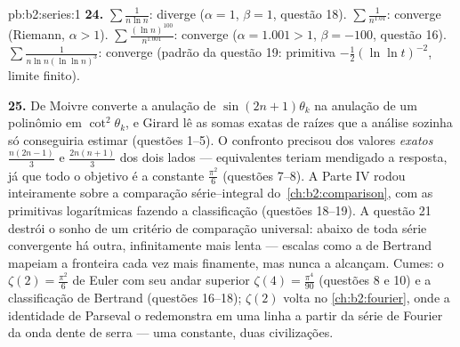 \begin{solution}{pb:b2:series:1}
\textbf{24.} $\sum\frac1{n\ln n}$: diverge ($\alpha = 1$,
$\beta = 1$, questão 18). $\sum\frac1{n^{1.01}}$: converge
(Riemann, $\alpha > 1$). $\sum\frac{(\ln n)^{100}}{n^{1.001}}$:
converge ($\alpha = 1.001 > 1$, $\beta = -100$, questão 16).
$\sum\frac1{n\ln n(\ln\ln n)^3}$: converge (padrão da questão 19:
primitiva $-\frac12(\ln\ln t)^{-2}$, limite finito).

\textbf{25.} De Moivre converte a anulação de $\sin(2n{+}1)
\theta_k$ na anulação de um polinômio em
$\cot^2\theta_k$, e Girard lê as somas exatas de raízes que
a análise sozinha só conseguiria estimar (questões 1--5). O
confronto precisou dos valores \emph{exatos} $\frac{n(2n-1)}3$ e
$\frac{2n(n+1)}3$ dos dois lados --- equivalentes teriam
mendigado a resposta, já que todo o objetivo é a constante
$\frac{\pi^2}6$ (questões 7--8). A Parte IV rodou inteiramente sobre
a comparação série--integral do~\cref{ch:b2:comparison}, com as
primitivas logarítmicas fazendo a classificação (questões
18--19). A questão 21 destrói o sonho de um critério de
comparação universal: abaixo de toda série convergente há outra,
infinitamente mais lenta --- escalas como a de Bertrand mapeiam a fronteira
cada vez mais finamente, mas nunca a alcançam. Cumes: o $\zeta(2)
= \frac{\pi^2}6$ de
Euler com seu andar superior $\zeta(4) =
\frac{\pi^4}{90}$ (questões 8 e 10) e a
classificação de Bertrand (questões 16--18); $\zeta(2)$ volta no
\cref{ch:b2:fourier}, onde a identidade de Parseval o redemonstra
em uma linha a partir da série de Fourier da onda dente de serra --- uma
constante, duas civilizações.
\end{solution}
